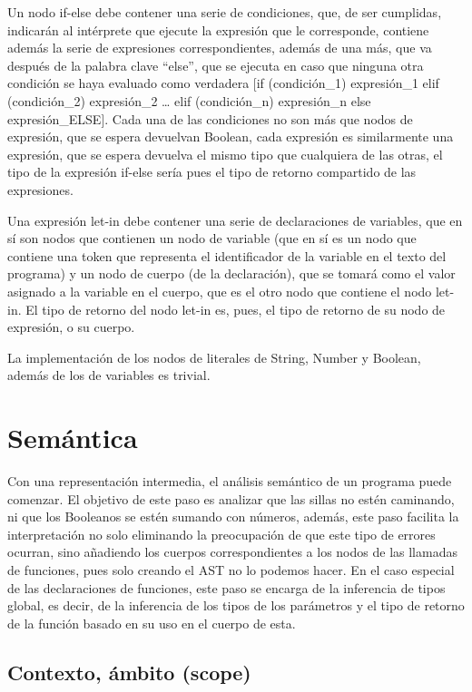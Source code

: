 \documentclass{article}
\begin{document}
Un nodo if-else debe contener una serie de condiciones, que, de ser cumplidas, indicarán al intérprete que ejecute la expresión que le corresponde, contiene además la serie de expresiones correspondientes, además de una más, que va después de la palabra clave “else”, que se ejecuta en caso que ninguna otra condición se haya evaluado como verdadera [if (condición\_1) expresión\_1 elif (condición\_2) expresión\_2 … elif (condición\_n) expresión\_n else expresión\_ELSE]. Cada una de las condiciones no son más que nodos de expresión, que se espera devuelvan Boolean, cada expresión es similarmente una expresión, que se espera devuelva el mismo tipo que cualquiera de las otras, el tipo de la expresión if-else sería pues el tipo de retorno compartido de las expresiones. 

Una expresión let-in debe contener una serie de declaraciones de variables, que en sí son nodos que contienen un nodo de variable (que en sí es un nodo que contiene una token que representa el identificador de la variable en el texto del programa) y un nodo de cuerpo (de la declaración), que se tomará como el valor asignado a la variable en el cuerpo, que es el otro nodo que contiene el nodo let-in. El tipo de retorno del nodo let-in es, pues, el tipo de retorno de su nodo de expresión, o su cuerpo.

La implementación de los nodos de literales de String, Number y Boolean, además de los de variables es trivial.

\newpage

\section{Semántica}

Con una representación intermedia, el análisis semántico de un programa puede comenzar. El objetivo de este paso es analizar que las sillas no estén caminando, ni que los Booleanos se estén sumando con números, además, este paso facilita la interpretación no solo eliminando la preocupación de que este tipo de errores ocurran, sino añadiendo los cuerpos correspondientes a los nodos de las llamadas de funciones, pues solo creando el AST no lo podemos hacer. En el caso especial de las declaraciones de funciones, este paso se encarga de la inferencia de tipos global, es decir, de la inferencia de los tipos de los parámetros y el tipo de retorno de la función basado en su uso en el cuerpo de esta.

\subsection{Contexto, ámbito (scope)}
\end{document}
